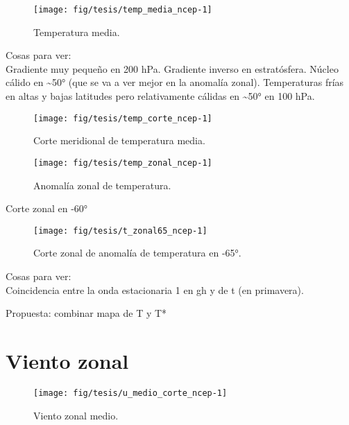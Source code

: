 \documentclass[spanish,a4paper]{book}
\begin{document}
\begin{figure}

{\centering \texttt{[image: fig/tesis/temp\_media\_ncep-1]} 

}

\caption{Temperatura media.}\label{fig:temp_media_ncep}
\end{figure}

Cosas para ver:\\
Gradiente muy pequeño en 200 hPa. Gradiente inverso en estratósfera.
Núcleo cálido en \textasciitilde{}50° (que se va a ver mejor en la
anomalía zonal). Temperaturas frías en altas y bajas latitudes pero
relativamente cálidas en \textasciitilde{}50° en 100 hPa.

\begin{figure}

{\centering \texttt{[image: fig/tesis/temp\_corte\_ncep-1]} 

}

\caption{Corte meridional de temperatura media.}\label{fig:temp_corte_ncep}
\end{figure}

\begin{figure}

{\centering \texttt{[image: fig/tesis/temp\_zonal\_ncep-1]} 

}

\caption{Anomalía zonal de temperatura.}\label{fig:temp_zonal_ncep}
\end{figure}

Corte zonal en -60°

\begin{figure}

{\centering \texttt{[image: fig/tesis/t\_zonal65\_ncep-1]} 

}

\caption{Corte zonal de anomalía de temperatura en -65°.}\label{fig:t_zonal65_ncep}
\end{figure}

Cosas para ver:\\
Coincidencia entre la onda estacionaria 1 en gh y de t (en primavera).

Propuesta: combinar mapa de T y T*

\section{Viento zonal}\label{viento-zonal}

\begin{figure}

{\centering \texttt{[image: fig/tesis/u\_medio\_corte\_ncep-1]} 

}

\caption{Viento zonal medio.}\label{fig:u_medio_corte_ncep}
\end{figure}
\end{document}
